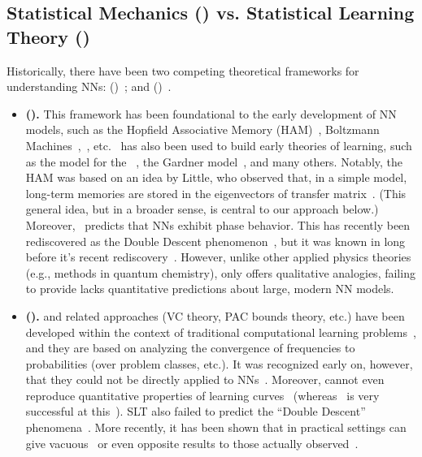 \subsection{Statistical Mechanics (\STATMECH) vs. Statistical Learning Theory (\SLT)}

Historically, there have been two competing theoretical frameworks for understanding NNs:
\emph{\StatisticalMechanics} (\STATMECH)~\cite{Eng01, EB01_BOOK, Gardner_1988,SST90, SST92, LTS90, Solla2023}; and 
\emph{\StatisticalLearningTheory} (\SLT)~\cite{Vapnik98}. 
\begin{itemize}
\item
\textbf{\StatisticalMechanics (\STATMECH).}
This framework has been foundational to the early development of NN models, such as the Hopfield Associative Memory (HAM)~\cite{Hop82}, Boltzmann Machines~\cite{AHS85},~\cite{HinSej86_relearn}, etc.
\STATMECH~has also been used to build early theories of learning, such as the \StudentTeacher model for the \Perceptron \GeneralizationError~\cite{Eng01,EB01_BOOK}, the Gardner model~\cite{Gardner_1988}, and many others.
Notably, the HAM was based on an idea by Little, who observed that, in a simple model, long-term memories are stored in the eigenvectors of transfer matrix~\cite{Lit74}.
(This general idea, but in a broader sense, is central to our approach below.)
Moreover, \STATMECH~predicts that NNs exhibit phase behavior.
This has recently been rediscovered as the Double Descent phenomenon~\cite{BHMM19,loog2020}, but it was known in \STATMECH long before it's recent rediscovery~\cite{Opper01}.
However, unlike other applied physics theories (e.g., \SemiEmpirical methods in quantum chemistry), \STATMECH only offers qualitative analogies, failing to provide lacks quantitative predictions
about large, modern NN models.\cite{roberts2022principles}
\item
\textbf{\StatisticalLearningTheory (\SLT).}
\SLT and related approaches (VC theory, PAC bounds theory, etc.) have been developed within the context of traditional computational learning problems~\cite{Vapnik98}, and 
they are based on analyzing the convergence of frequencies to probabilities (over problem classes, etc.).
It was recognized early on, however, that they could not be directly applied to NNs~\cite{VLL94}.
Moreover, \SLT cannot even reproduce quantitative properties of learning curves~\cite{WRB93,DKST96} (whereas \STATMECH~is very successful at this~\cite{SST92}).
SLT also failed to predict the ``Double Descent'' phenomena~\cite{BHMM19}.
More recently, it has been shown that in practical settings
\SLT can give vacuous~\cite{DR17_nonvacuous_TR} or even opposite results
to those actually observed~\cite{MM21a_simpsons_TR}.
\end{itemize}

